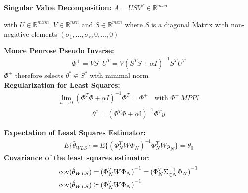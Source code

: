 \begin{tcolorbox}[colback=red!5!white,colframe=red!75!black,title=\textbf{Ill-Posed Least Squares}]	
\textbf{Singular Value Decomposition: } $A = USV^T \in\mathbb R^{mxn} $
\begin{addmargin}[1em]{0em}
	with $U\in\mathbb R^{mxm}$, $V\in\mathbb R^{nxn}$ and $S\in\mathbb R^{mxn}$ where $S$ is a diagonal Matrix with non-negative elements $(\sigma_1,\dots,\sigma_r, 0,\dots,0)$\\
\end{addmargin}
\textbf{Moore Penrose Pseudo Inverse: }
\begin{align*}
	\Phi^+ = VS^+ U^T = V(S^T S+\alpha I)^{-1} S^T U^T
\end{align*}
\hspace{1em} $\Phi^+$ therefore selects $\theta^* \in S^*$ with minimal norm \\
\textbf{Regularization for Least Squares:}
\begin{align*}
	\underset{a \rightarrow 0}{\lim} (\Phi^T \Phi + \alpha I)^{-1} \Phi^T = \Phi^+ \quad \text{with }\Phi^+ \, MPPI 
\end{align*}
\begin{align*}
\theta^* = (\Phi^T \Phi + \alpha \mathbb{I})^{-1} \Phi^T y
\end{align*}
\end{tcolorbox}

\begin{tcolorbox}[colback=red!5!white,colframe=red!75!black,title=\textbf{Statistical Analysis of WLS}]
\textbf{Expectation of Least Squares Estimator: }
\begin{align*}
	E \{\hat \theta_{WLS} \} = E \{ {(\Phi_{N}^{T} W \Phi_N)}^{-1} \Phi_{N}^{T} W y_N \} = \theta_0
\end{align*}
\textbf{Covariance of the least squares estimator: }
\begin{align*}
	\mathrm{cov}(\hat \theta_{WLS}) &= {(\Phi_{N}^{T} W \Phi_N)}^{-1} = {(\Phi_{N}^{T} \Sigma_{\in N }^{-1} \Phi_{N}) }^{-1} \\
	\mathrm{cov}(\hat \theta_{WLS}) &\succeq {(\Phi_{N}^{T} W \Phi_{N})}^{-1}
\end{align*}
\end{tcolorbox}

